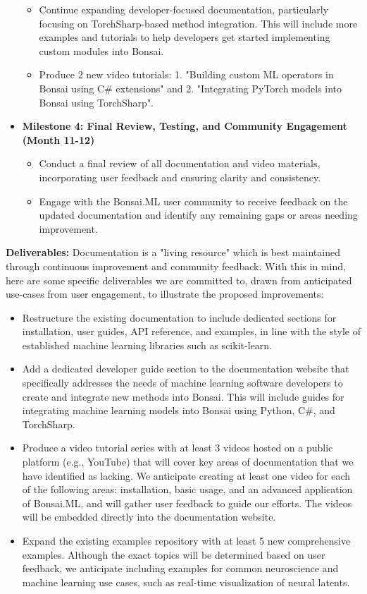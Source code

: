 \begin{itemize}
\begin{itemize}
        \item Continue expanding developer-focused documentation, particularly focusing on TorchSharp-based method integration. This will include more examples and tutorials to help developers get started implementing custom modules into Bonsai.
        \item Produce 2 new video tutorials: 1. "Building custom ML operators in Bonsai using C\# extensions" and 2. "Integrating PyTorch models into Bonsai using TorchSharp".
    \end{itemize}
    \item \textbf{Milestone 4: Final Review, Testing, and Community Engagement (Month 11-12)}
    \begin{itemize}
        \item Conduct a final review of all documentation and video materials, incorporating user feedback and ensuring clarity and consistency.
        \item Engage with the Bonsai.ML user community to receive feedback on the updated documentation and identify any remaining gaps or areas needing improvement.
    \end{itemize}
\end{itemize}

\textbf{Deliverables:}
Documentation is a "living resource" which is best maintained through continuous improvement and community feedback. With this in mind, here are some specific deliverables we are committed to, drawn from anticipated use-cases from user engagement, to illustrate the proposed improvements:

\begin{itemize}
    \item Restructure the existing documentation to include dedicated sections for installation, user guides, API reference, and examples, in line with the style of established machine learning libraries such as scikit-learn.
    \item Add a dedicated developer guide section to the documentation website that specifically addresses the needs of machine learning software developers to create and integrate new methods into Bonsai. This will include guides for integrating machine learning models into Bonsai using Python, C\#, and TorchSharp.
    \item Produce a video tutorial series with at least 3 videos hosted on a public platform (e.g., YouTube) that will cover key areas of documentation that we have identified as lacking. We anticipate creating at least one video for each of the following areas: installation, basic usage, and an advanced application of Bonsai.ML, and will gather user feedback to guide our efforts. The videos will be embedded directly into the documentation website.
    \item Expand the existing examples repository with at least 5 new comprehensive examples. Although the exact topics will be determined based on user feedback, we anticipate including examples for common neuroscience and machine learning use cases, such as real-time visualization of neural latents.
\end{itemize}
